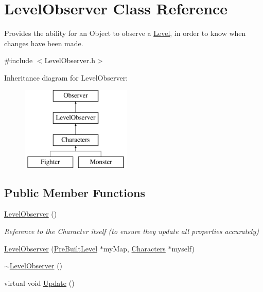 \hypertarget{class_level_observer}{}\section{Level\+Observer Class Reference}
\label{class_level_observer}


Provides the ability for an Object to observe a \hyperlink{class_level}{Level}, in order to know when changes have been made.  




{\ttfamily \#include $<$Level\+Observer.\+h$>$}

Inheritance diagram for Level\+Observer\+:\begin{figure}[H]
\begin{center}
\leavevmode
\includegraphics[height=4.000000cm]{class_level_observer}
\end{center}
\end{figure}
\subsection*{Public Member Functions}
\begin{DoxyCompactItemize}
\item 
\hypertarget{class_level_observer_af9335950382fc7bc63dd77a92bab563f}{}\label{class_level_observer_af9335950382fc7bc63dd77a92bab563f} 
\hyperlink{class_level_observer_af9335950382fc7bc63dd77a92bab563f}{Level\+Observer} ()
\begin{DoxyCompactList}\small\item\em Reference to the Character itself (to ensure they update all properties accurately) \end{DoxyCompactList}\item 
\hyperlink{class_level_observer_a89ab0b90a4d29dbfa3527d37e83824c0}{Level\+Observer} (\hyperlink{class_pre_built_level}{Pre\+Built\+Level} $\ast$my\+Map, \hyperlink{class_characters}{Characters} $\ast$myself)
\item 
\hyperlink{class_level_observer_a1d36fff128f92b806f8cb0e9c5dd317f}{$\sim$\+Level\+Observer} ()
\item 
virtual void \hyperlink{class_level_observer_af6107e84befc375ee764f52dd3061d9f}{Update} ()
\end{DoxyCompactItemize}
